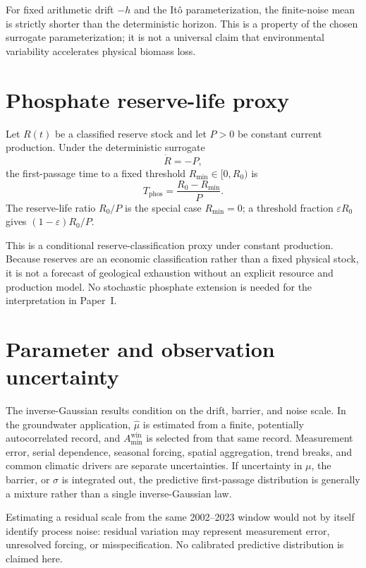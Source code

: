 \documentclass[11pt]{article}
\theoremstyle{definition}
\begin{document}
For fixed arithmetic drift $-h$ and the It\^o parameterization, the finite-noise mean is strictly shorter than the deterministic horizon. This is a property of the chosen surrogate parameterization; it is not a universal claim that environmental variability accelerates physical biomass loss.

\section{Phosphate reserve-life proxy}
\label{sec:phosphate}

Let $R(t)$ be a classified reserve stock and let $P>0$ be constant current production. Under the deterministic surrogate
\begin{equation}
\dot R=-P,
\label{eq:phosphate}
\end{equation}
the first-passage time to a fixed threshold $R_{\min}\in[0,R_0)$ is
\begin{equation}
T_{\mathrm{phos}}=\frac{R_0-R_{\min}}{P}.
\label{eq:phos-time}
\end{equation}
The reserve-life ratio $R_0/P$ is the special case $R_{\min}=0$; a threshold fraction $\varepsilon R_0$ gives $(1-\varepsilon)R_0/P$.

This is a conditional reserve-classification proxy under constant production. Because reserves are an economic classification rather than a fixed physical stock, it is not a forecast of geological exhaustion without an explicit resource and production model. No stochastic phosphate extension is needed for the interpretation in Paper~I.

\section{Parameter and observation uncertainty}
\label{sec:uncertainty}

The inverse-Gaussian results condition on the drift, barrier, and noise scale. In the groundwater application, $\widehat\mu$ is estimated from a finite, potentially autocorrelated record, and $A_{\min}^{\mathrm{win}}$ is selected from that same record. Measurement error, serial dependence, seasonal forcing, spatial aggregation, trend breaks, and common climatic drivers are separate uncertainties. If uncertainty in $\mu$, the barrier, or $\sigma$ is integrated out, the predictive first-passage distribution is generally a mixture rather than a single inverse-Gaussian law.

Estimating a residual scale from the same 2002--2023 window would not by itself identify process noise: residual variation may represent measurement error, unresolved forcing, or misspecification. No calibrated predictive distribution is claimed here.
\end{document}
